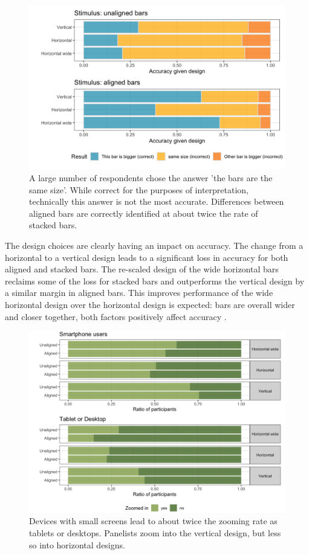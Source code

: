 \documentclass[10pt]{article}\usepackage[]{graphicx}\usepackage[table]{xcolor}
\begin{document}
\begin{figure}
\centering
\includegraphics[width=\columnwidth]{images/fig-aligned-round4-1.png}
\caption{\label{fig:aligned} A large number of respondents chose the answer 'the bars are the same size'. While correct for the purposes of interpretation, technically this answer is not the most accurate. Differences between aligned bars are correctly identified at about twice the rate of stacked bars. }
\end{figure}
The design choices are clearly having an impact on accuracy. The change from a horizontal to a vertical design leads to a significant loss in accuracy for both aligned and stacked bars. 
The re-scaled design of the wide horizontal bars reclaims some of the loss for stacked bars and outperforms the vertical design by a similar margin in aligned bars. 
This improves performance of the wide horizontal design over the horizontal design is expected: bars are overall wider and closer together, both factors positively affect accuracy \cite{lu2021jnd}.

\begin{figure}
\centering
\includegraphics[width=\columnwidth]{images/zoomers3-1.png}
\caption{\label{zooming}Devices with small screens lead to about twice the zooming rate as tablets or desktops. Panelists zoom into the vertical design, but less so into horizontal designs.}
\end{figure}
\end{document}

